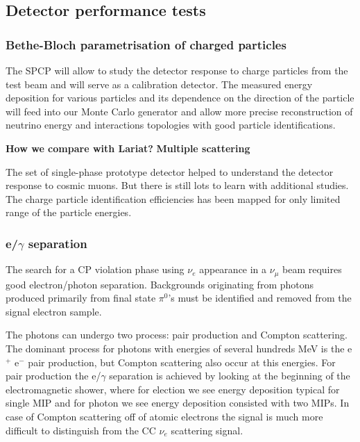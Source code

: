 \subsection{Detector performance tests}

\subsubsection{Bethe-Bloch parametrisation of charged particles}

The SPCP will allow to study the detector response to charge particles from the test beam and will serve as a calibration detector. The measured energy deposition for various particles and its dependence on the direction of the particle will feed into our Monte Carlo generator and allow more precise reconstruction of neutrino energy and interactions topologies with good particle identifications.
 
{\bf How we compare with Lariat?} 
{\bf Multiple scattering}  

The set of single-phase prototype detector helped to understand the detector response to cosmic muons. But there is still lots to learn with additional studies. 
The charge  particle identification efficiencies  has been mapped for only limited range of the particle energies.  

\subsubsection{e/$\gamma$ separation}

The search for a CP violation phase using $\nu_e$ appearance 
in a $\nu_\mu$ beam requires good electron/photon separation.
Backgrounds originating from photons produced primarily from 
final state $\pi^0$'s must be identified and removed from the signal
electron sample. 


The photons can undergo two process: pair production and Compton scattering. 
The dominant process for photons with energies of several hundreds MeV  is 
the e$^+$ e$^-$ pair production, but Compton scattering also occur at this 
energies. For pair production the e/$\gamma$ separation is achieved by looking 
at the beginning of the electromagnetic shower, where for election we see energy 
deposition typical for single MIP and for photon we see energy deposition consisted 
with two MIPs. In case of Compton scattering off of atomic electrons the 
signal is much more difficult to distinguish from the CC $\nu_e$ scattering signal.


